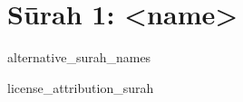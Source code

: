 \begin{comment}
The following strings are to be replaced by a script, in order to use this file as a template (all upper case):-
* sNO = sūrah number, without leading zeros
* sZO = sūrah number, with leading zeros
\end{comment}
\begin{comment}
The following tags are declared here:-
alternative_surah_names
license_attribution_surah
\end{comment}
\section{Sūrah 1: <name>}
\begin{taggedblock}{alternative_surah_names}
\end{taggedblock}
\END

\begin{taggedblock}{license_attribution_surah}

\end{taggedblock}